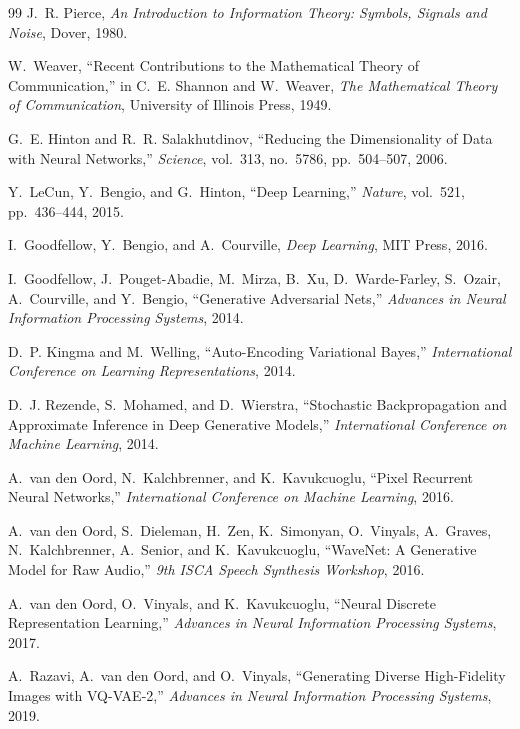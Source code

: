 \documentclass[11pt,a4paper]{article}
\theoremstyle{definition}
\theoremstyle{remark}
\begin{document}
\begin{thebibliography}{99}
J.~R. Pierce,
\newblock \emph{An Introduction to Information Theory: Symbols, Signals and Noise},
\newblock Dover, 1980.

W.~Weaver,
\newblock ``Recent Contributions to the Mathematical Theory of Communication,''
\newblock in C.~E. Shannon and W.~Weaver, \emph{The Mathematical Theory of Communication},
\newblock University of Illinois Press, 1949.

G.~E. Hinton and R.~R. Salakhutdinov,
\newblock ``Reducing the Dimensionality of Data with Neural Networks,''
\newblock \emph{Science}, vol.~313, no.~5786, pp.~504--507, 2006.

Y.~LeCun, Y.~Bengio, and G.~Hinton,
\newblock ``Deep Learning,''
\newblock \emph{Nature}, vol.~521, pp.~436--444, 2015.

I.~Goodfellow, Y.~Bengio, and A.~Courville,
\newblock \emph{Deep Learning},
\newblock MIT Press, 2016.

I.~Goodfellow, J.~Pouget-Abadie, M.~Mirza, B.~Xu, D.~Warde-Farley, S.~Ozair, A.~Courville, and Y.~Bengio,
\newblock ``Generative Adversarial Nets,''
\newblock \emph{Advances in Neural Information Processing Systems}, 2014.

D.~P. Kingma and M.~Welling,
\newblock ``Auto-Encoding Variational Bayes,''
\newblock \emph{International Conference on Learning Representations}, 2014.

D.~J. Rezende, S.~Mohamed, and D.~Wierstra,
\newblock ``Stochastic Backpropagation and Approximate Inference in Deep Generative Models,''
\newblock \emph{International Conference on Machine Learning}, 2014.

A.~van den Oord, N.~Kalchbrenner, and K.~Kavukcuoglu,
\newblock ``Pixel Recurrent Neural Networks,''
\newblock \emph{International Conference on Machine Learning}, 2016.

A.~van den Oord, S.~Dieleman, H.~Zen, K.~Simonyan, O.~Vinyals, A.~Graves, N.~Kalchbrenner, A.~Senior, and K.~Kavukcuoglu,
\newblock ``WaveNet: A Generative Model for Raw Audio,''
\newblock \emph{9th ISCA Speech Synthesis Workshop}, 2016.

A.~van den Oord, O.~Vinyals, and K.~Kavukcuoglu,
\newblock ``Neural Discrete Representation Learning,''
\newblock \emph{Advances in Neural Information Processing Systems}, 2017.

A.~Razavi, A.~van den Oord, and O.~Vinyals,
\newblock ``Generating Diverse High-Fidelity Images with VQ-VAE-2,''
\newblock \emph{Advances in Neural Information Processing Systems}, 2019.


\end{thebibliography}
\end{document}

